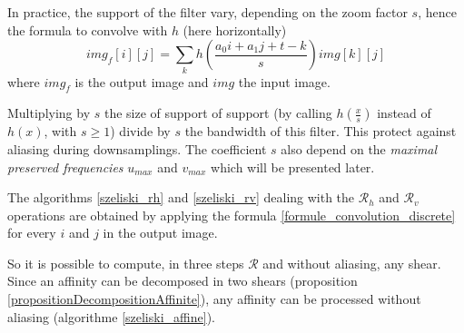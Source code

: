 	In practice, the support of the filter vary, depending on the zoom factor $s$, hence the formula to convolve with $h$ (here horizontally)
	\begin{equation}
	img_f[i][j] = \displaystyle{\sum_k}h\left(\frac{a_0i+a_1j+t-k}{s}\right)img[k][j]
	\label{formule_convolution_discrete}
	\end{equation}
	where $img_f$ is the output image and $img$ the input image.
	
	
	
	Multiplying by $s$ the size of support of support (by calling $h(\frac{x}{s})$ instead of $h(x)$, with $s\geq 1$) divide by $s$ the bandwidth of this filter. This protect against aliasing during downsamplings. The coefficient $s$ also depend on the \emph{maximal preserved frequencies} $u_{max}$ and $v_{max}$ which will be presented later.
	
	
	The algorithms \ref{szeliski_rh} and \ref{szeliski_rv} dealing with the $\mathcal R_h$ and $\mathcal R_v$ operations are obtained by applying the formula \ref{formule_convolution_discrete} for every $i$ and $j$ in the output image. \label{szeliski_rv_rh_section}
	
	
	So it is possible to compute, in three steps $\mathcal R$ and without aliasing, any shear. Since an affinity can be decomposed in two shears (proposition \ref{propositionDecompositionAffinite}), any affinity can be processed without aliasing (algorithme \ref{szeliski_affine}).
	

